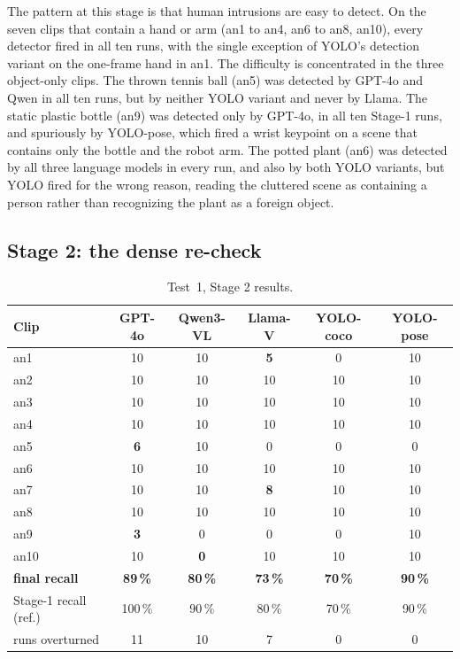 \documentclass[11pt,a4paper]{article}
\begin{document}
The pattern at this stage is that human intrusions are easy to detect. On
the seven clips that contain a hand or arm (an1 to an4, an6 to an8, an10),
every detector fired in all ten runs, with the single exception of YOLO's
detection variant on the one-frame hand in an1. The difficulty is
concentrated in the three object-only clips. The thrown tennis ball (an5)
was detected by GPT-4o and Qwen in all ten runs, but by neither YOLO
variant and never by Llama. The static plastic bottle (an9) was detected
only by GPT-4o, in all ten Stage-1 runs, and spuriously by YOLO-pose,
which fired a wrist keypoint on a scene that contains only the bottle and
the robot arm. The potted plant (an6) was detected by all three language
models in every run, and also by both YOLO variants, but YOLO fired for
the wrong reason, reading the cluttered scene as containing a person
rather than recognizing the plant as a foreign object.

\subsection{Stage 2: the dense re-check}

\begin{table}[h]
\centering
\small
\setlength{\tabcolsep}{5pt}
\begin{tabular}{@{}l ccc cc@{}}
\toprule
Clip & GPT-4o & Qwen3-VL & Llama-V & YOLO-coco & YOLO-pose \\
\midrule
an1  & 10 & 10 & \textbf{5} & 0  & 10 \\
an2  & 10 & 10 & 10 & 10 & 10 \\
an3  & 10 & 10 & 10 & 10 & 10 \\
an4  & 10 & 10 & 10 & 10 & 10 \\
an5  & \textbf{6} & 10 & 0 & 0 & 0 \\
an6  & 10 & 10 & 10 & 10 & 10 \\
an7  & 10 & 10 & \textbf{8} & 10 & 10 \\
an8  & 10 & 10 & 10 & 10 & 10 \\
an9  & \textbf{3} & 0 & 0 & 0 & 10 \\
an10 & 10 & \textbf{0} & 10 & 10 & 10 \\
\midrule
\textbf{final recall} & \textbf{89\,\%} & \textbf{80\,\%} & \textbf{73\,\%}
                      & \textbf{70\,\%} & \textbf{90\,\%} \\
\midrule
Stage-1 recall (ref.) & 100\,\% & 90\,\% & 80\,\% & 70\,\% & 90\,\% \\
runs overturned & 11 & 10 & 7 & 0 & 0 \\
\bottomrule
\end{tabular}
\caption{Test~1, Stage 2 results.}
\label{tab:test1-stage2}
\end{table}
\FloatBarrier
\end{document}
